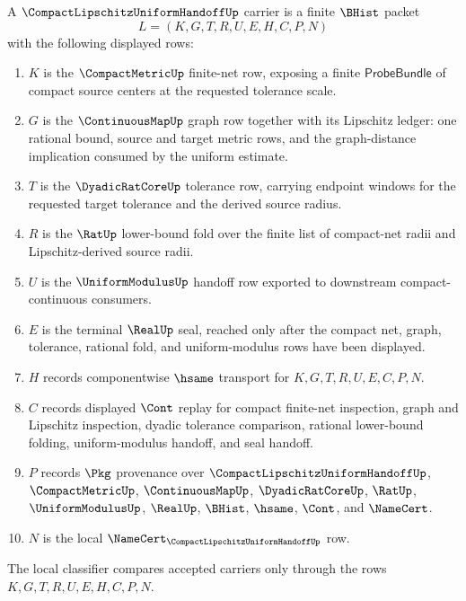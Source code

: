 \begin{definition}
\label{def:compact-lipschitz-uniform-handoff-carrier}
A $\CompactLipschitzUniformHandoffUp$ carrier is a finite $\BHist$ packet
$$
L=(K,G,T,R,U,E,H,C,P,N)
$$
with the following displayed rows:
\begin{enumerate}
\item $K$ is the $\CompactMetricUp$ finite-net row, exposing a finite $\mathsf{ProbeBundle}$ of compact source centers at the requested tolerance scale.
\item $G$ is the $\ContinuousMapUp$ graph row together with its Lipschitz ledger: one rational bound, source and target metric rows, and the graph-distance implication consumed by the uniform estimate.
\item $T$ is the $\DyadicRatCoreUp$ tolerance row, carrying endpoint windows for the requested target tolerance and the derived source radius.
\item $R$ is the $\RatUp$ lower-bound fold over the finite list of compact-net radii and Lipschitz-derived source radii.
\item $U$ is the $\UniformModulusUp$ handoff row exported to downstream compact-continuous consumers.
\item $E$ is the terminal $\RealUp$ seal, reached only after the compact net, graph, tolerance, rational fold, and uniform-modulus rows have been displayed.
\item $H$ records componentwise $\hsame$ transport for $K,G,T,R,U,E,C,P,N$.
\item $C$ records displayed $\Cont$ replay for compact finite-net inspection, graph and Lipschitz inspection, dyadic tolerance comparison, rational lower-bound folding, uniform-modulus handoff, and seal handoff.
\item $P$ records $\Pkg$ provenance over $\CompactLipschitzUniformHandoffUp$, $\CompactMetricUp$, $\ContinuousMapUp$, $\DyadicRatCoreUp$, $\RatUp$, $\UniformModulusUp$, $\RealUp$, $\BHist$, $\hsame$, $\Cont$, and $\NameCert$.
\item $N$ is the local $\NameCert_{\CompactLipschitzUniformHandoffUp}$ row.
\end{enumerate}
The local classifier compares accepted carriers only through the rows $K,G,T,R,U,E,H,C,P,N$.
\end{definition}

